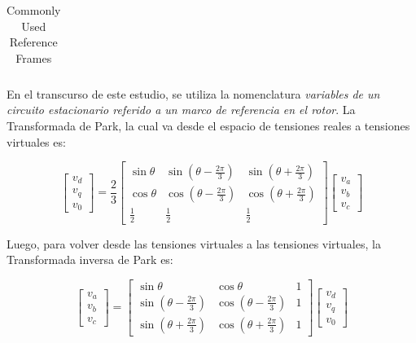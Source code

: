 \documentclass[blue,fullpaper]{ludusofficial}  %
\begin{document}
\begin{table}[htpb]
\begin{tabular}{@{}llcc@{}}
        \bottomrule
    \end{tabular}
    \caption{Commonly Used Reference Frames}
    \label{tab:reference_frames}
\end{table}

En el transcurso de este estudio, se utiliza la nomenclatura \textit{variables de un circuito estacionario referido a un marco de referencia en el rotor}. La Transformada de Park, la cual va desde el espacio de tensiones reales a tensiones virtuales es:

\begin{equation}
\label{eq:park-directa}
\begin{bmatrix}
    v_d \\ v_q \\v_0
\end{bmatrix} 
=
\frac{2}{3} 
\begin{bmatrix}
    \sin \theta & \sin\left(\theta - \frac{2\pi}{3}\right) & \sin\left(\theta + \frac{2\pi}{3}\right) \\[1em]
    \cos \theta & \cos\left(\theta - \frac{2\pi}{3}\right) & \cos\left(\theta + \frac{2\pi}{3}\right) \\[1em]
    \frac{1}{2} & \frac{1}{2} & \frac{1}{2}
\end{bmatrix}
\begin{bmatrix}
    v_a \\ v_b \\v_c
\end{bmatrix} 
\end{equation}

Luego, para volver desde las tensiones virtuales a las tensiones virtuales, la Transformada inversa de Park es:

\begin{equation}
\label{eq:park-inversa}
\begin{bmatrix}
    v_a \\ v_b \\v_c
\end{bmatrix} 
=
\begin{bmatrix}
    \sin \theta & \cos \theta  & 1 \\[1em]
     \sin\left(\theta - \frac{2\pi}{3}\right) & \cos\left(\theta - \frac{2\pi}{3}\right) & 1 \\[1em]
     \sin\left(\theta + \frac{2\pi}{3}\right) & \cos\left(\theta + \frac{2\pi}{3}\right) & 1
\end{bmatrix}
\begin{bmatrix}
    v_d \\ v_q \\v_0
\end{bmatrix} 
\end{equation}
\end{document}

